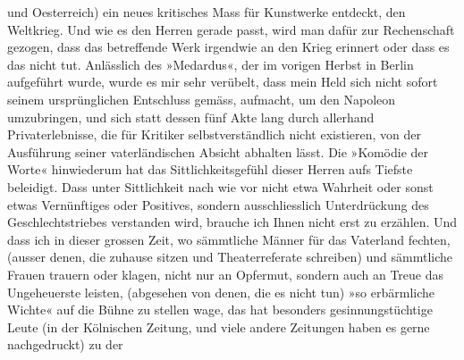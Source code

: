 \begin{ledgroupsized}[t]{13cm}
               und Oesterreich) ein neues kritisches Mass für
               Kunstwerke entdeckt,  den Weltkrieg. Und wie
               es den Herren gerade passt, wird man dafür zur Rechenschaft gezogen, dass das
               betreffende Werk irgendwie an den Krieg erinnert oder dass es das nicht tut.
               Anlässlich des »Medardus«, der im vorigen Herbst in
                  Berlin aufgeführt wurde, wurde es mir sehr
               verübelt, dass mein Held sich nicht sofort seinem ursprünglichen Entschluss gemäss,
               aufmacht, um den Napoleon umzubringen, und sich
               statt dessen fünf Akte lang durch allerhand Privaterlebnisse, die für Kritiker
               selbstverständlich {\pb}nicht existieren, von der
               Ausführung seiner vaterländischen Absicht abhalten lässt. Die »Komödie der Worte« hinwiederum hat das Sittlichkeitsgefühl dieser
               Herren aufs Tiefste beleidigt. Dass unter Sittlichkeit nach wie vor nicht etwa
               Wahrheit oder sonst etwas Vernünftiges oder Positives, sondern ausschliesslich
               Unterdrückung des Geschlechtstrieb\introOben{}e\introOben{}s verstanden wird,
               brauche ich Ihnen nicht erst zu erzählen. Und dass ich in dieser grossen Zeit, wo
               sämmtliche Männer für das Vaterland fechten, (ausser denen, die zuhause sitzen und
               Theaterreferate schreiben) und sämmtliche Frauen trauern oder klagen, nicht nur an
               Opfermut, sondern auch an Treue das Ungeheuerste leisten, (abgesehen von denen, die
               es nicht tun) »so erbärmliche Wichte« auf die Bühne zu stellen wage, das hat
               besonders gesinnungstüchtige Leute (in der Kölnischen
                  Zeitung, und viele andere Zeitungen haben es gerne nachgedruckt) zu der

\end{ledgroupsized}
